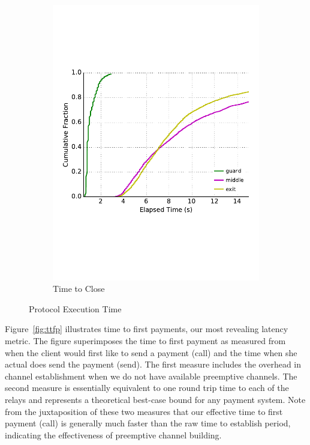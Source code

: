 \begin{figure}
\begin{subfigure}[t]{0.32\textwidth}
\includegraphics[trim={0 3cm 0 3cm}, clip, width=1.0\textwidth]{images/payment_close.pdf}
		\caption{Time to Close}
\label{fig:payments_close}
	\end{subfigure}
	\caption{Protocol Execution Time}
\label{fig:latencymeasurements}
\end{figure}


Figure~\ref{fig:ttfp} illustrates time to first payments, our most
revealing latency metric. The figure superimposes the time to first payment as
measured from when the client would first like to send a payment (call) and the
time when she actual does send the payment (send). The first measure includes
the overhead in channel establishment when we do not have available preemptive
channels. The second measure is essentially equivalent to one round trip time to
each of the relays and represents a theoretical best-case bound for any payment
system. Note from the juxtaposition of these two measures that our effective
time to first payment (call) is generally much faster than the raw time to
establish period, indicating the effectiveness of preemptive channel building.


